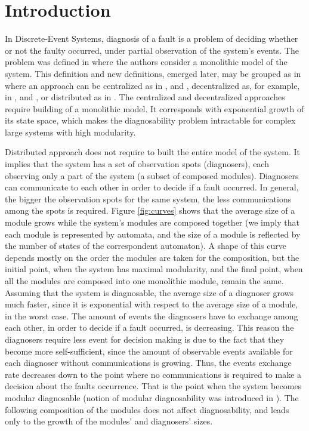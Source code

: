 \documentclass[a4paper, 10pt, conference]{ieeeconf}
\begin{document}
\section{Introduction}

In Discrete-Event Systems, diagnosis of a fault is a problem of deciding whether
or not the faulty occurred, under partial observation of the system's events.
The problem was defined in \cite{sampath_diagnosability_1995} where the authors
consider a monolithic model of the system. This definition and new definitions,
emerged later, may be grouped as in \cite{su_global_2005} where an approach can
be centralized as in \cite{sampath_diagnosability_1995}, 
\cite{jiang_polynomial_2001} and 
\cite{yoo_polynomial-time_2002}, 
decentralized as, for example, in \cite{debouk_coordinated_1998},
\cite{pencole_formal_2005} and \cite{qiu_decentralized_2006}, 
or distributed as in \cite{su_distributed_2002}.
The centralized and decentralized approaches require building of a monolithic
model. It corresponds with exponential growth of its state space, which makes
the diagnosability problem intractable for complex large systems with high
modularity. 

Distributed approach does not require to built the entire model of
the system. It implies that the system has a set of observation spots
(diagnosers), each observing only a part of the system (a subset of composed
modules). Diagnosers can communicate to each other in order to decide if a fault
occurred. In general, the bigger the observation spots for the same
system, the less communications among the spots is required.
Figure \ref{fig:curves} shows that the average size of a module grows while the
system's modules are composed together (we imply that each module is represented
by automata, and the size of a module is reflected by the number of states of
the correspondent automaton).
A shape of this curve depends mostly on the order the modules are taken for the
composition, but the initial point, when the system has maximal modularity, and
the final point, when all the modules are composed into one monolithic module,
remain the same. Assuming that the system is diagnosable, the average size of a
diagnoser grows much faster, since it is exponential with respect to the average
size of a module, in the worst case.
The amount of events the diagnosers have to exchange among each other, in order
to decide if a fault occurred, is decreasing. This reason the diagnosers require
less event for decision making is due to the fact that they become more
self-sufficient, since the amount of observable events available for each
diagnoser without communications is growing. Thus, the events exchange rate
decreases down to the point where no communications is required to make a
decision about the faults occurrence. That is the point when the system becomes
modular diagnosable (notion of modular diagnosability was introduced in
\cite{contant_diagnosability_2006}). The following composition of the modules
does not affect diagnosability, and leads only to the growth of the modules' and
diagnosers' sizes. 
\end{document}
